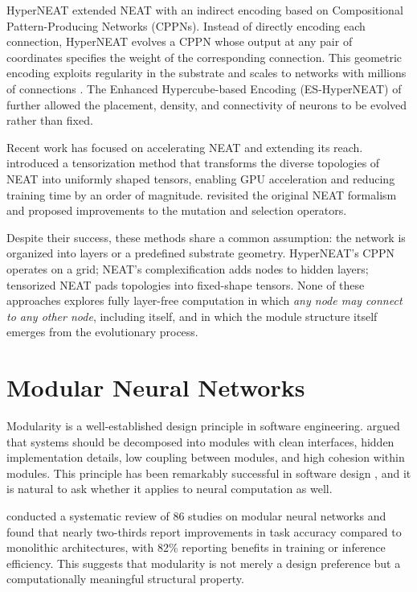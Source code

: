 HyperNEAT \citep{stanley2009hypercube} extended NEAT with an indirect encoding
based on Compositional Pattern-Producing Networks (CPPNs). Instead of directly
encoding each connection, HyperNEAT evolves a CPPN whose output at any pair of
coordinates specifies the weight of the corresponding connection. This
geometric encoding exploits regularity in the substrate and scales to
networks with millions of connections \citep{clune2011performance}. The
Enhanced Hypercube-based Encoding (ES-HyperNEAT) of \citet{risi2012enhanced}
further allowed the placement, density, and connectivity of neurons to be
evolved rather than fixed.

Recent work has focused on accelerating NEAT and extending its reach.
\citet{wang2024tensorized} introduced a tensorization method that transforms
the diverse topologies of NEAT into uniformly shaped tensors, enabling GPU
acceleration and reducing training time by an order of magnitude.
\citet{lyubchev2025revisiting} revisited the original NEAT formalism and
proposed improvements to the mutation and selection operators.

Despite their success, these methods share a common assumption: the network is
organized into layers or a predefined substrate geometry. HyperNEAT's CPPN
operates on a grid; NEAT's complexification adds nodes to hidden layers;
tensorized NEAT pads topologies into fixed-shape tensors. None of these
approaches explores fully layer-free computation in which \emph{any node may
connect to any other node}, including itself, and in which the module structure
itself emerges from the evolutionary process.

\section{Modular Neural Networks}
\label{sec:modular}

Modularity is a well-established design principle in software engineering.
\citet{parnas1972modularity} argued that systems should be decomposed into
modules with clean interfaces, hidden implementation details, low coupling
between modules, and high cohesion within modules. This principle has been
remarkably successful in software design \citep{larman2004applying}, and it is
natural to ask whether it applies to neural computation as well.

\citet{alho2024modularity} conducted a systematic review of 86 studies on
modular neural networks and found that nearly two-thirds report improvements
in task accuracy compared to monolithic architectures, with 82\% reporting
benefits in training or inference efficiency. This suggests that modularity
is not merely a design preference but a computationally meaningful structural
property.

